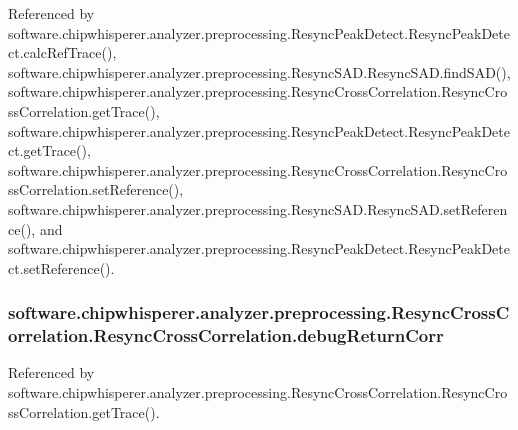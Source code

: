 Referenced by software.\+chipwhisperer.\+analyzer.\+preprocessing.\+Resync\+Peak\+Detect.\+Resync\+Peak\+Detect.\+calc\+Ref\+Trace(), software.\+chipwhisperer.\+analyzer.\+preprocessing.\+Resync\+S\+A\+D.\+Resync\+S\+A\+D.\+find\+S\+A\+D(), software.\+chipwhisperer.\+analyzer.\+preprocessing.\+Resync\+Cross\+Correlation.\+Resync\+Cross\+Correlation.\+get\+Trace(), software.\+chipwhisperer.\+analyzer.\+preprocessing.\+Resync\+Peak\+Detect.\+Resync\+Peak\+Detect.\+get\+Trace(), software.\+chipwhisperer.\+analyzer.\+preprocessing.\+Resync\+Cross\+Correlation.\+Resync\+Cross\+Correlation.\+set\+Reference(), software.\+chipwhisperer.\+analyzer.\+preprocessing.\+Resync\+S\+A\+D.\+Resync\+S\+A\+D.\+set\+Reference(), and software.\+chipwhisperer.\+analyzer.\+preprocessing.\+Resync\+Peak\+Detect.\+Resync\+Peak\+Detect.\+set\+Reference().

\hypertarget{classsoftware_1_1chipwhisperer_1_1analyzer_1_1preprocessing_1_1ResyncCrossCorrelation_1_1ResyncCrossCorrelation_af10bc83fcb8bca318376d322a394e329}{}
\subsubsection[{debug\+Return\+Corr}]{\setlength{\rightskip}{0pt plus 5cm}software.\+chipwhisperer.\+analyzer.\+preprocessing.\+Resync\+Cross\+Correlation.\+Resync\+Cross\+Correlation.\+debug\+Return\+Corr}\label{classsoftware_1_1chipwhisperer_1_1analyzer_1_1preprocessing_1_1ResyncCrossCorrelation_1_1ResyncCrossCorrelation_af10bc83fcb8bca318376d322a394e329}


Referenced by software.\+chipwhisperer.\+analyzer.\+preprocessing.\+Resync\+Cross\+Correlation.\+Resync\+Cross\+Correlation.\+get\+Trace().

\hypertarget{classsoftware_1_1chipwhisperer_1_1analyzer_1_1preprocessing_1_1ResyncCrossCorrelation_1_1ResyncCrossCorrelation_a3874af5f74706b4c19b2d5572221f0d6}{}
